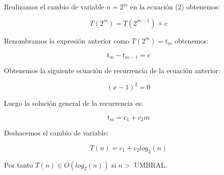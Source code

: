 Realizamos el cambio de variable $n = 2^{m}$ en la ecuación (2) obtenemos:

\begin{equation*}
    T(2^{m}) =  T(2^{m-1}) + c 
\end{equation*}

Renombramos la expresión anterior como $T(2^{m}) = t_{m}$ obtenemos:

\begin{equation*}
    t_{m} - t_{m-1} = c 
\end{equation*}

Obtenemos la siguiente ecuación de recurrencia de la ecuación anterior:

\begin{equation}
    (x-1)^{2} = 0
\end{equation}

Luego la solución general de la recurrencia es:

\begin{equation}
    t_{m} = c_{1} + c_{2}m
\end{equation}

Deshacemos el cambio de variable:

\begin{equation}
    T(n) = c_{1} + c_{2}log_{2}(n)
\end{equation}

Por tanto $T(n) \in O(log_{2}(n))$ si $n >$ UMBRAL.

